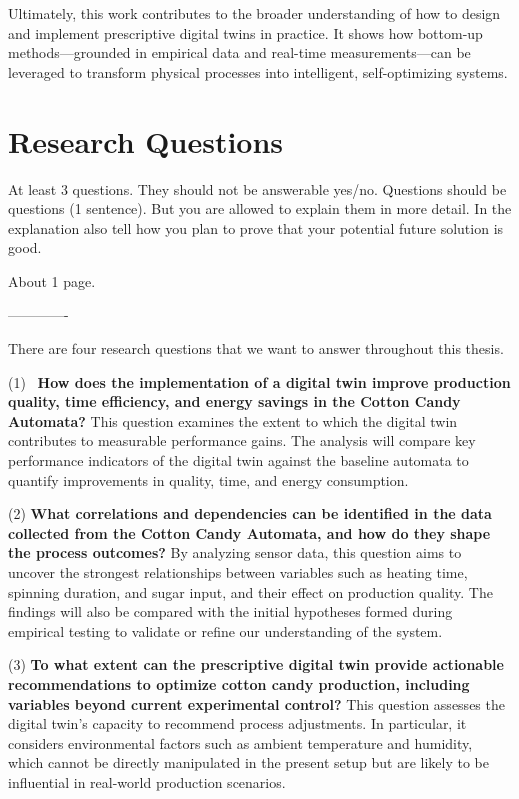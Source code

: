 Ultimately, this work contributes to the broader understanding of how to design and implement prescriptive digital twins in practice. It shows how bottom-up methods—grounded in empirical data and real-time measurements—can be leveraged to transform physical processes into intelligent, self-optimizing systems.

\section{Research Questions}
\label{sec:intro:rq}
At least 3 questions. They should not be answerable yes/no. Questions should be
questions (1 sentence). But you are allowed to explain them in more detail. In
the explanation also tell how you plan to prove that your potential future
solution is good.

About 1 page.


-------------

There are four research questions that we want to answer throughout this thesis.

(1) \
\textbf{How does the implementation of a digital twin improve production quality, time efficiency, and energy savings in the Cotton Candy Automata?}
This question examines the extent to which the digital twin contributes to measurable performance gains. The analysis will compare key performance indicators of the digital twin against the baseline automata to quantify improvements in quality, time, and energy consumption.

(2) \textbf{What correlations and dependencies can be identified in the data collected from the Cotton Candy Automata, and how do they shape the process outcomes?}
By analyzing sensor data, this question aims to uncover the strongest relationships between variables such as heating time, spinning duration, and sugar input, and their effect on production quality. The findings will also be compared with the initial hypotheses formed during empirical testing to validate or refine our understanding of the system.

(3) \textbf{To what extent can the prescriptive digital twin provide actionable recommendations to optimize cotton candy production, including variables beyond current experimental control?}
This question assesses the digital twin’s capacity to recommend process adjustments. In particular, it considers environmental factors such as ambient temperature and humidity, which cannot be directly manipulated in the present setup but are likely to be influential in real-world production scenarios.


